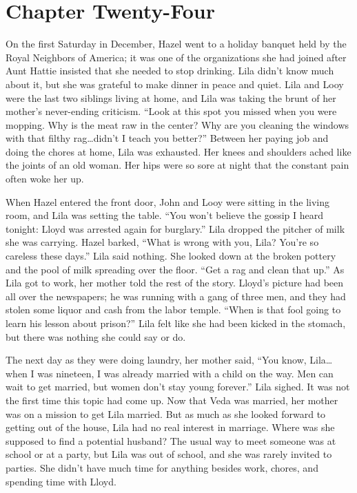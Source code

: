 \documentclass[
  american,
  letterpaper,
]{book}
\begin{document}

\chapter{Chapter Twenty-Four}\label{chapter-twenty-four}

On the first Saturday in December, Hazel went to a holiday banquet held
by the Royal Neighbors of America; it was one of the organizations she
had joined after Aunt Hattie insisted that she needed to stop drinking.
Lila didn't know much about it, but she was grateful to make dinner in
peace and quiet. Lila and Looy were the last two siblings living at
home, and Lila was taking the brunt of her mother's never-ending
criticism. ``Look at this spot you missed when you were mopping. Why is
the meat raw in the center? Why are you cleaning the windows with that
filthy rag\ldots didn't I teach you better?'' Between her paying job and
doing the chores at home, Lila was exhausted. Her knees and shoulders
ached like the joints of an old woman. Her hips were so sore at night
that the constant pain often woke her up.

When Hazel entered the front door, John and Looy were sitting in the
living room, and Lila was setting the table. ``You won't believe the
gossip I heard tonight: Lloyd was arrested again for burglary.'' Lila
dropped the pitcher of milk she was carrying. Hazel barked, ``What is
wrong with you, Lila? You're so careless these days.'' Lila said
nothing. She looked down at the broken pottery and the pool of milk
spreading over the floor. ``Get a rag and clean that up.'' As Lila got
to work, her mother told the rest of the story. Lloyd's picture had been
all over the newspapers; he was running with a gang of three men, and
they had stolen some liquor and cash from the labor temple. ``When is
that fool going to learn his lesson about prison?'' Lila felt like she
had been kicked in the stomach, but there was nothing she could say or
do.

The next day as they were doing laundry, her mother said, ``You know,
Lila\ldots when I was nineteen, I was already married with a child on
the way. Men can wait to get married, but women don't stay young
forever.'' Lila sighed. It was not the first time this topic had come
up. Now that Veda was married, her mother was on a mission to get Lila
married. But as much as she looked forward to getting out of the house,
Lila had no real interest in marriage. Where was she supposed to find a
potential husband? The usual way to meet someone was at school or at a
party, but Lila was out of school, and she was rarely invited to
parties. She didn't have much time for anything besides work, chores,
and spending time with Lloyd.
\end{document}
